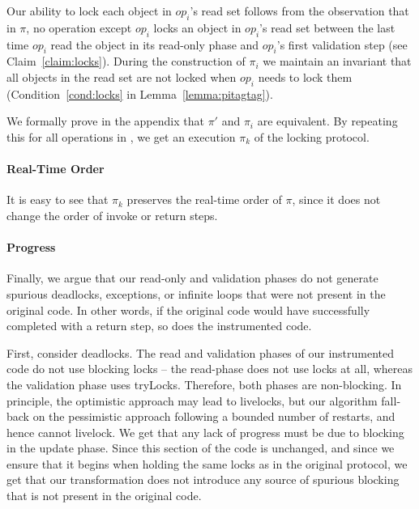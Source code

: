 {Our ability to lock each object in $op_i$'s read set follows from the
observation that in $\pi$, no operation except $op_i$ locks an object in
$op_i$'s read set between the last time $op_i$ read the object in its
read-only phase and $op_i$'s first validation step (see Claim~\ref{claim:locks}). 
During the construction of $\pi_i$ we maintain
an invariant that all objects in the read set are not locked when $op_i$ needs
to lock them (Condition~\ref{cond:locks} in Lemma~\ref{lemma:pitagtag}).


We formally prove in the appendix that $\pi'$ and $\pi_i$ are equivalent. 
By repeating this for all operations in \op, we get an execution $\pi_k$ of the locking protocol.

\paragraph{Real-Time Order}
It is easy to see that $\pi_k$ preserves the real-time order of $\pi$, since it does not change the order of invoke or return steps. 
}

\paragraph{Progress}
Finally, we argue that our read-only and validation phases do not generate spurious deadlocks, exceptions,
or infinite loops that were not present in the original code. In other words, if the original code would have
successfully completed with a return step, so does the instrumented code.

First, consider deadlocks.
The read and validation phases of our instrumented code do not use blocking locks -- the read-phase does not use locks at all, whereas the 
validation phase uses tryLocks. Therefore, both phases are non-blocking. In principle, the optimistic approach may lead to livelocks, but 
our algorithm fall-back on the pessimistic approach following a bounded number of restarts, and hence cannot livelock. 
We get that any lack
of progress must be due to blocking in the update phase. Since this section of the code is unchanged, and
since we ensure that it begins when holding the same locks as in the original protocol, we get that our transformation does not introduce any
source of spurious blocking that is not present in the original  code. 

